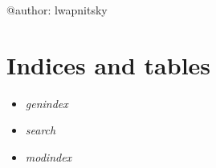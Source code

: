 \documentclass[letterpaper,10pt,english]{sphinxmanual}
\begin{document}
@author: lwapnitsky


\chapter{Indices and tables}
\label{index:indices-and-tables}\begin{itemize}
\item {} 
\emph{genindex}

\item {} 
\emph{search}

\item {} 
\emph{modindex}

\end{itemize}



\renewcommand{\indexname}{Index}
\printindex
\end{document}
